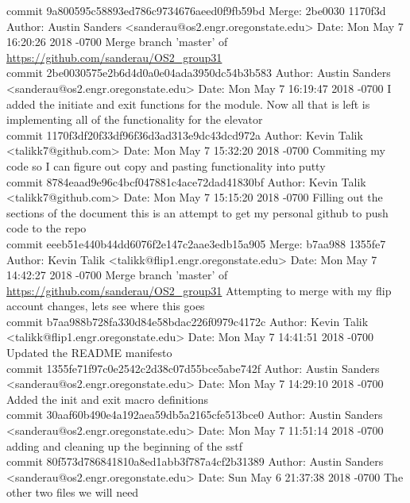 \documentclass[onecolumn, draftclsnofoot,10pt, compsoc]{IEEEtran}
\begin{document}
{commit 9a800595c58893ed786c9734676aeed0f9fb59bd
Merge: 2be0030 1170f3d
Author: Austin Sanders <sanderau@os2.engr.oregonstate.edu>
Date:   Mon May 7 16:20:26 2018 -0700
Merge branch 'master' of \url{https://github.com/sanderau/OS2_group31}\\

commit 2be0030575e2b6d4d0a0e04ada3950dc54b3b583
Author: Austin Sanders <sanderau@os2.engr.oregonstate.edu>
Date:   Mon May 7 16:19:47 2018 -0700
I added the initiate and exit functions for the module. Now all that is left is implementing all of the functionality for the elevator \\

commit 1170f3df20f33df96f36d3ad313e9dc43dcd972a
Author: Kevin Talik <talikk7@github.com>
Date:   Mon May 7 15:32:20 2018 -0700
Commiting my code so I can figure out copy and pasting functionality into putty\\

commit 8784eaad9e96c4bcf047881c4ace72dad41830bf
Author: Kevin Talik <talikk7@github.com>
Date:   Mon May 7 15:15:20 2018 -0700
Filling out the sections of the document
this is an attempt to get my personal github to push code to the repo\\

commit eeeb51e440b44dd6076f2e147c2aae3edb15a905
Merge: b7aa988 1355fe7
Author: Kevin Talik <talikk@flip1.engr.oregonstate.edu>
Date:   Mon May 7 14:42:27 2018 -0700
Merge branch 'master' of \url{https://github.com/sanderau/OS2_group31}
Attempting to merge with my flip account changes, lets see where this goes\\

commit b7aa988b728fa330d84e58bdac226f0979c4172c
Author: Kevin Talik <talikk@flip1.engr.oregonstate.edu>
Date:   Mon May 7 14:41:51 2018 -0700
Updated the README manifesto\\

commit 1355fe71f97c0e2542c2d38c07d55bce5abe742f
Author: Austin Sanders <sanderau@os2.engr.oregonstate.edu>
Date:   Mon May 7 14:29:10 2018 -0700
Added the init and exit macro definitions\\

commit 30aaf60b490e4a192aea59db5a2165cfe513bce0
Author: Austin Sanders <sanderau@os2.engr.oregonstate.edu>
Date:   Mon May 7 11:51:14 2018 -0700
adding and cleaning up the beginning of the sstf \\

commit 80f573d786841810a8ed1abb3f787a4cf2b31389
Author: Austin Sanders <sanderau@os2.engr.oregonstate.edu>
Date:   Sun May 6 21:37:38 2018 -0700
The other two files we will need\\

}
\end{document}
